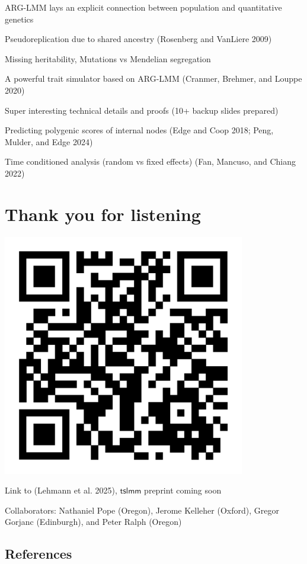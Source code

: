\documentclass[
  letterpaper,
  DIV=11,
  numbers=noendperiod]{scrartcl}
\begin{document}
ARG-LMM lays an explicit connection between population and quantitative
genetics

Pseudoreplication due to shared ancestry (Rosenberg and VanLiere 2009)

Missing heritability, Mutations vs Mendelian segregation

A powerful trait simulator based on ARG-LMM (Cranmer, Brehmer, and
Louppe 2020)

Super interesting technical details and proofs (10+ backup slides
prepared)

Predicting polygenic scores of internal nodes (Edge and Coop 2018; Peng,
Mulder, and Edge 2024)

Time conditioned analysis (random vs fixed effects) (Fan, Mancuso, and
Chiang 2022)

\section{Thank you for listening}\label{thank-you-for-listening}

\includegraphics[width=\linewidth,height=4.16667in,keepaspectratio]{slides_files/mediabag/imgs/qr_code.pdf}

Link to (Lehmann et al. 2025), \(\textsf{tslmm}\) preprint coming soon

Collaborators: Nathaniel Pope (Oregon), Jerome Kelleher (Oxford), Gregor
Gorjanc (Edinburgh), and Peter Ralph (Oregon)

\subsection{References}\label{references}
\end{document}
